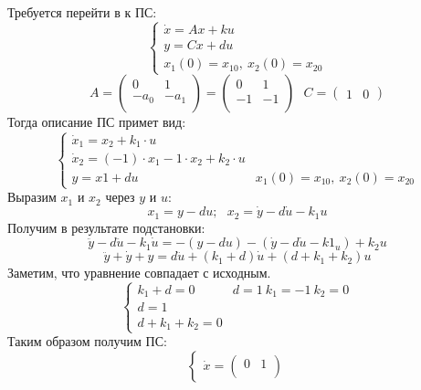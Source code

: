 \documentclass[../../TAU.tex]{subfiles}
\begin{document}
    {
        Требуется перейти в к ПС:
        $$
        \begin{cases}
            \dot x=Ax+ku \\
            y=Cx+du      \\
            x_1(0)=x_{10},\ x_2(0)=x_{20}
        \end{cases}
        $$
        $$
            A=
            \begin{pmatrix}
                0  & 1  \\
                -a_0 & -a_1 \\
            \end{pmatrix}
            =
            \begin{pmatrix}
                0  & 1  \\
                -1 & -1 \\
            \end{pmatrix}\ \ \ 
            C=
            \begin{pmatrix}
                1 & 0 
            \end{pmatrix}
        $$
        Тогда описание ПС примет вид:
        $$
        \begin{cases}
            \dot x_1 = x_2+k_1\cdot u                        \\
            \dot x_2 = (-1)\cdot x_1 -1\cdot x_2 +k_2\cdot u \\
            y = x1+du & x_1(0)=x_{10},\ x_2(0)=x_{20}
        \end{cases}
        $$
        Выразим $x_1$ и $x_2$ через $y$ и $u$:
        $$
            x_1=y-du;\ \ \ x_2=\dot y-d\dot u-k_1 u
        $$
        Получим в результате подстановки:
        $$
            \ddot y - d\ddot u - k_1\dot u=-(y-du)-(\dot y-d\dot u-k1_u)+k_2u
        $$
        $$
            \ddot y + \dot y +y=d\ddot u+(k_1+d)\dot u+(d+k_1+k_2)u
        $$
        Заметим, что уравнение совпадает с исходным.
        $$
            \begin{cases}
                k_1+d=0 & d=1\ k_1=-1\ k_2=0 \\
                d = 1                        \\
                d+k_1+k_2=0
            \end{cases}
        $$ 
        Таким образом получим ПС:
        $$
            \begin{cases}
                \dot x = 
                \begin{pmatrix}
                     0 &  1 \\

\end{pmatrix}
\end{cases}$$}
\end{document}
